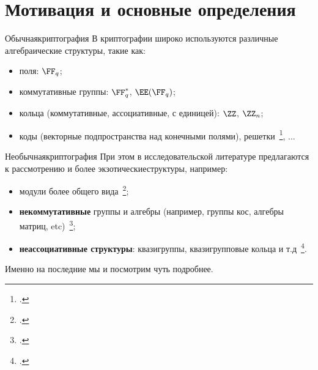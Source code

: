 
\section{Мотивация и основные определения}

\begin{frame}{ \guillemotleft Обычная\guillemotright криптография}
    В криптографии широко используются различные алгебраические структуры, такие как:
    \begin{itemize}
        \item поля: $\FF_q$;
        \pause
        \item коммутативные группы: $\FF_q^*$, $\EE(\FF_q)$;
        \pause
        \item кольца (коммутативные, ассоциативные, с единицей): $\ZZ$, $\ZZ_n$;
        \pause
        \item коды (векторные подпространства над конечными полями), решетки~\footcite{pqcrypto}, ...
    \end{itemize}
\end{frame}


\begin{frame}{ \guillemotleft Необычная\guillemotright криптография}
    При этом в исследовательской литературе предлагаются к рассмотрению и более  \guillemotleft экзотические\guillemotright структуры, например:
    \begin{itemize}
        \item модули более общего вида~\footcite{nechaev95};
        \pause
        \item \textbf{некоммутативные} группы и алгебры (например, группы кос, алгебры матриц, etc)~\footcite{myasnikov2011non, romankov, moldovyan};
        \pause
        \item \textbf{неассоциативные структуры}: квазигруппы, квазигрупповые кольца и т.д~\footcite{glukhov, artamonov18, markov2020nonassociative}.
    \end{itemize}
    \pause
    Именно на последние мы и посмотрим чуть подробнее.
\end{frame}


